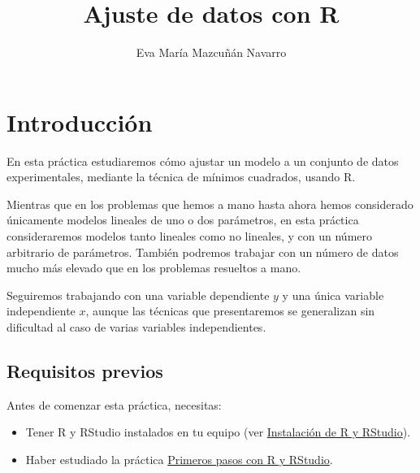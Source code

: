 \documentclass[
  title=normal,
  notoc,
  nobib,
  degree=mecinf]{mnye}
\title{Ajuste de datos con R}
\author{Eva María Mazcuñán Navarro}
\date{}
\begin{document}
\maketitle

%

{
\hypersetup{linkcolor=etoccolor}
\setcounter{tocdepth}{2}
\tableofcontents
}
\hypertarget{section}{%
\section*{}\label{section}}

\hypertarget{intro}{%
\section*{Introducción}\label{intro}}

En esta práctica estudiaremos cómo ajustar un modelo a un conjunto de datos experimentales, mediante la técnica de mínimos cuadrados, usando \textsf{R}.

Mientras que en los problemas que hemos a mano hasta ahora hemos considerado únicamente modelos lineales de uno o dos parámetros, en esta práctica consideraremos modelos tanto lineales como no lineales, y con un número arbitrario de parámetros. También podremos trabajar con un número de datos mucho más elevado que en los problemas resueltos a mano.

Seguiremos trabajando con una variable dependiente \(y\) y una única variable independiente \(x\), aunque las técnicas que presentaremos se generalizan sin dificultad al caso de varias variables independientes.

\hypertarget{prerequisites}{%
\subsection*{Requisitos previos}\label{prerequisites}}

Antes de comenzar esta práctica, necesitas:

\begin{itemize}
\item
  Tener \textsf{R} y \textsf{RStudio} instalados en tu equipo (ver \href{https://emazcunan.github.io/install-r-rstudio/}{Instalación de R y RStudio}).
\item
  Haber estudiado la práctica \href{https://emazcunan.github.io/basics-r-rstudio/}{Primeros pasos con R y RStudio}.
\end{itemize}
\end{document}
